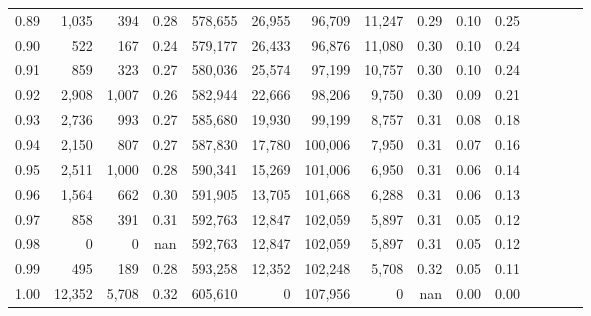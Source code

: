 \begin{tabular}{rrrcrrrrrrrrrrr}
0.89 &   1,035 &    394 &                                       0.28 &  578,655 &   26,955 &   96,709 &   11,247 &  0.29 &  0.10 &                         0.25 \\
0.90 &     522 &    167 &                                       0.24 &  579,177 &   26,433 &   96,876 &   11,080 &  0.30 &  0.10 &                         0.24 \\
0.91 &     859 &    323 &                                       0.27 &  580,036 &   25,574 &   97,199 &   10,757 &  0.30 &  0.10 &                         0.24 \\
0.92 &   2,908 &  1,007 &                                       0.26 &  582,944 &   22,666 &   98,206 &    9,750 &  0.30 &  0.09 &                         0.21 \\
0.93 &   2,736 &    993 &                                       0.27 &  585,680 &   19,930 &   99,199 &    8,757 &  0.31 &  0.08 &                         0.18 \\
0.94 &   2,150 &    807 &                                       0.27 &  587,830 &   17,780 &  100,006 &    7,950 &  0.31 &  0.07 &                         0.16 \\
0.95 &   2,511 &  1,000 &                                       0.28 &  590,341 &   15,269 &  101,006 &    6,950 &  0.31 &  0.06 &                         0.14 \\
0.96 &   1,564 &    662 &                                       0.30 &  591,905 &   13,705 &  101,668 &    6,288 &  0.31 &  0.06 &                         0.13 \\
0.97 &     858 &    391 &                                       0.31 &  592,763 &   12,847 &  102,059 &    5,897 &  0.31 &  0.05 &                         0.12 \\
0.98 &       0 &      0 &                                        nan &  592,763 &   12,847 &  102,059 &    5,897 &  0.31 &  0.05 &                         0.12 \\
0.99 &     495 &    189 &                                       0.28 &  593,258 &   12,352 &  102,248 &    5,708 &  0.32 &  0.05 &                         0.11 \\
1.00 &  12,352 &  5,708 &                                       0.32 &  605,610 &        0 &  107,956 &        0 &   nan &  0.00 &                         0.00 \\
\bottomrule
\end{tabular}
